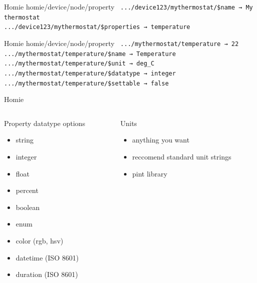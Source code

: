 \documentclass{presentation}
\begin{document}
\begin{frame}{Homie}
  \vfill
  {\huge homie/device/node/property}
  \texttt{
  \vfill
  .../device123/mythermostat/\$name → My thermostat  \\
  .../device123/mythermostat/\$properties → temperature \\
  }
\end{frame}

\begin{frame}{Homie}
  \vfill
  {\huge homie/device/node/property}
  \texttt{
  \vfill
  .../mythermostat/temperature → 22 \\
  .../mythermostat/temperature/\$name → Temperature \\
  .../mythermostat/temperature/\$unit → deg\_C \\
  .../mythermostat/temperature/\$datatype → integer \\
  .../mythermostat/temperature/\$settable → false \\
  }
\end{frame}

\begin{frame}{Homie}
  \begin{columns}
    \begin{column}{0.5\textwidth}
      Property datatype options
      \begin{itemize}
        \item string
        \item integer
        \item float
        \item percent
        \item boolean
        \item enum
        \item color (rgb, hsv)
        \item datetime (ISO 8601)
        \item duration (ISO 8601)
      \end{itemize}
    \end{column}
    \begin{column}{0.5\textwidth}
      Units
      \begin{itemize}
        \item anything you want
	\item reccomend standard unit strings
        \item pint library
      \end{itemize}
    \end{column}
  \end{columns}
\end{frame}
\end{document}
